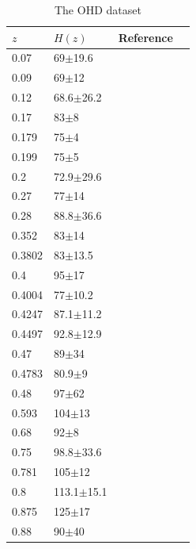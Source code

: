 \documentclass[twocolumn]{aastex631}
\begin{document}
   \begin{table}[htbp]
      \caption{The OHD dataset}
      \centering
      \begin{tabular}{llll}
         \hline\hline
         $z$ & $H(z)$ & Reference \\
         \hline     
         0.07 & 69$\pm$19.6 & \cite{Zhang_2014} \\
         0.09 & 69$\pm$12 & \cite{PhysRevD.71.123001} \\
         0.12 & 68.6$\pm$26.2 & \cite{Zhang_2014} \\
         0.17 & 83$\pm$8 & \cite{PhysRevD.71.123001} \\
         0.179 & 75$\pm$4 & \cite{M.Moresco_2012} \\
         0.199 & 75$\pm$5 & \cite{M.Moresco_2012} \\
         0.2 & 72.9$\pm$29.6 & \cite{Zhang_2014} \\
         0.27 & 77$\pm$14 & \cite{PhysRevD.71.123001} \\
         0.28 & 88.8$\pm$36.6 & \cite{Zhang_2014} \\
         0.352 & 83$\pm$14 & \cite{M.Moresco_2012} \\
         0.3802 & 83$\pm$13.5 & \cite{Moresco_2016}  \\
         0.4 & 95$\pm$17 & \cite{PhysRevD.71.123001} \\
         0.4004 & 77$\pm$10.2 & \cite{Moresco_2016} \\
         0.4247 & 87.1$\pm$11.2 & \cite{Moresco_2016} \\
         0.4497 & 92.8$\pm$12.9 & \cite{Moresco_2016} \\
         0.47 & 89$\pm$34 & \cite{10.1093/mnras/stx301} \\
         0.4783 & 80.9$\pm$9 & \cite{Moresco_2016} \\
         0.48 & 97$\pm$62 & \cite{Daniel.Stern_2010} \\
         0.593 & 104$\pm$13 & \cite{M.Moresco_2012} \\
         0.68 & 92$\pm$8 & \cite{M.Moresco_2012} \\
         0.75 & 98.8$\pm$33.6 & \cite{Borghi_2022} \\
         0.781 & 105$\pm$12 & \cite{M.Moresco_2012} \\
         0.8 & 113.1$\pm$15.1 & \cite{Jiao_2023} \\
         0.875 & 125$\pm$17 & \cite{M.Moresco_2012} \\
         0.88 & 90$\pm$40 & \cite{Daniel.Stern_2010} \\

\end{tabular}
\end{table}
\end{document}
